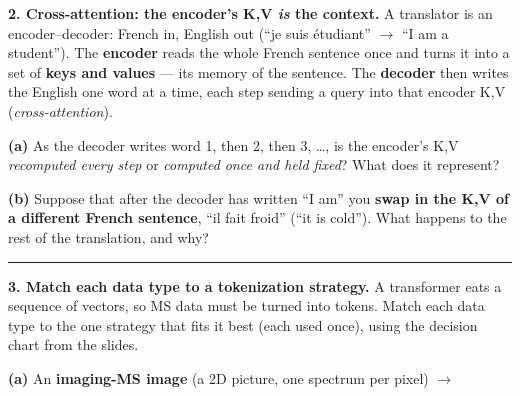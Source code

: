 \documentclass[11pt]{article}
\newif\ifsolution
\newcommand{\blk}[1]{\underline{\hspace{#1}}}
\newcommand{\rb}[2]{\ifsolution\textbf{#1}\else\blk{#2}\fi}
\newcommand{\keybox}[1]{\ifsolution\par\vspace{2pt}%
  \fbox{\parbox{0.965\textwidth}{\small\textbf{Answer.}\; #1}}\par\fi}
\newcommand{\work}[1]{\ifsolution\else\vspace{#1}\fi}
\begin{document}
\textbf{2. Cross-attention: the encoder's K,V \emph{is} the context.}\; {\small A translator is an
encoder--decoder: French in, English out (``je suis \'etudiant'' $\rightarrow$ ``I am a student''). The
\textbf{encoder} reads the whole French sentence once and turns it into a set of \textbf{keys and values} ---
its memory of the sentence. The \textbf{decoder} then writes the English one word at a time, each step sending
a query into that encoder K,V (\emph{cross-attention}).}

\vspace{4pt}
\textbf{(a)} As the decoder writes word 1, then 2, then 3, \dots, is the encoder's K,V \emph{recomputed
every step} or \emph{computed once and held fixed}? What does it represent?

\work{0.95cm}
\ifsolution\else\blk{\linewidth}\fi

\vspace{3pt}
\textbf{(b)} Suppose that after the decoder has written ``I am'' you \textbf{swap in the K,V of a different
French sentence}, ``il fait froid'' (``it is cold''). What happens to the rest of the translation, and why?

\work{0.95cm}
\ifsolution\else\blk{\linewidth}\fi

\keybox{(a) \textbf{Computed once and held fixed} for the whole decode --- it is the model's \textbf{context /
memory of the source sentence}. Every word the decoder writes queries the \emph{same} encoder K,V, which is how
each output word can look back at the whole French sentence. (b) The rest of the English is now translated
from the \textbf{wrong sentence}: it follows ``il fait froid'' instead of ``je suis \'etudiant'', so the
output becomes a \textbf{wrong / incoherent translation} (e.g.\ ``I am \dots cold'') --- because the encoder's
K,V \emph{is} the context the output is grounded in. Change the context and you change what the decoder is
``reading.''}

\vspace{2pt}\hrule\vspace{5pt}

\textbf{3. Match each data type to a tokenization strategy.}\; {\small A transformer eats a sequence of
vectors, so MS data must be turned into tokens. Match each data type to the one strategy that fits it
best (each used once), using the decision chart from the slides.}

\vspace{4pt}
\textbf{(a)} An \textbf{imaging-MS image} (a 2D picture, one spectrum per pixel)\hfill
$\rightarrow$\;\rb{patches + linear projection (ViT)}{5.2cm}
\end{document}
